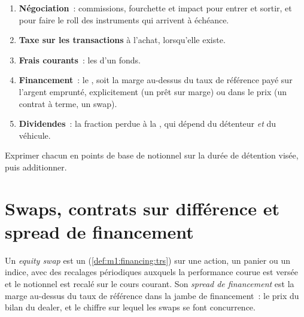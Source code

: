 \begin{method}\label{met:m1:delta-one-instruments:five}
\begin{enumerate}
\item \textbf{Négociation}~: commissions, fourchette et impact pour entrer et sortir,
et pour faire le roll des instruments qui arrivent à échéance.
\item \textbf{Taxe sur les transactions} à l'achat, lorsqu'elle existe.
\item \textbf{Frais courants}~: les  d'un fonds.
\item \textbf{Financement}~: le , soit la marge au-dessus du taux de référence payé sur l'argent
emprunté, explicitement (un prêt sur marge) ou dans le prix (un contrat à terme,
un swap).
\item \textbf{Dividendes}~: la fraction perdue à la , qui dépend
du détenteur \emph{et} du véhicule.
\end{enumerate}
Exprimer chacun en points de base de notionnel sur la durée de détention visée,
puis additionner.
\end{method}

\section{Swaps, contrats sur différence et spread de financement}

\begin{definition}\label{def:m1:delta-one-instruments:swap}
Un \emph{equity swap} est un 
(\cref{def:m1:financing:trs}) sur une action, un panier ou un indice, avec des
recalages périodiques auxquels la performance courue est versée et le notionnel est
recalé sur le cours courant. Son \emph{spread de financement} est la
marge au-dessus du taux de référence dans la jambe de financement~: le prix du
bilan du dealer, et le chiffre sur lequel les swaps se font concurrence.
\end{definition}

